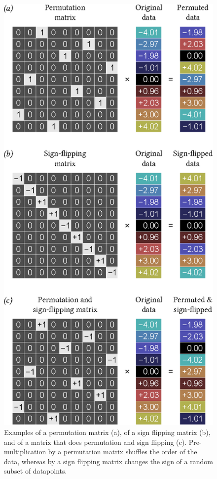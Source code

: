 \begin{figure}[!p]
\centering
\includegraphics{images/pmatrices.eps}
\caption[Examples of permutation and sign flipping matrix.]{Examples of a permutation matrix (a), of a sign flipping matrix (b), and of a matrix that does permutation and sign flipping (c). Pre-multiplication by a permutation matrix shuffles the order of the data, whereas by a sign flipping matrix changes the sign of a random subset of datapoints.}
\label{fig:pmatrices}
\end{figure}

